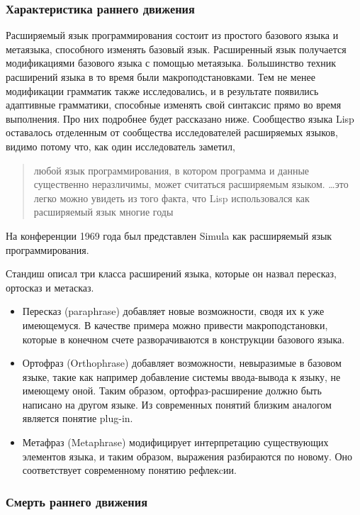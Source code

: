 \documentclass[a4paper,12pt]{article}
\begin{document}
\subsubsection{Характеристика раннего движения}

Расширяемый язык программирования состоит из простого базового языка и
метаязыка, способного изменять базовый язык. Расширенный язык получается
модификациями базового языка с помощью метаязыка. Большинство техник расширений
языка в то время были макроподстановками. Тем не менее модификации грамматик 
также исследовались, и в результате появились адаптивные грамматики, способные
изменять свой синтаксис прямо во время выполнения. Про них подробнее будет 
рассказано ниже. Сообщество языка Lisp оставалось отделенным от сообщества
исследователей расширяемых языков, видимо потому что, как один исследователь
заметил, \cite{harr60}
\begin{quote}
любой язык программирования, в котором программа и данные существенно
неразличимы, может считаться расширяемым языком. \ldots это легко можно увидеть
из того факта, что Lisp использовался как расширяемый язык многие годы
\end{quote}
На конференции 1969 года был представлен Simula как расширяемый язык
программирования.

Стандиш описал три класса расширений языка, которые он назвал пересказ,
ортосказ и метасказ.
\begin{itemize}
  \item Пересказ (paraphrase) добавляет новые возможности, сводя их к уже
  имеющемуся. В качестве примера можно привести макроподстановки, которые в
  конечном счете разворачиваются в конструкции базового языка.
  \item Ортофраз (Orthophrase) добавляет возможности, невыразимые в базовом
  языке, такие как например добавление системы ввода-вывода к языку, не имеющему оной. Таким
  образом, ортофраз-расширение должно быть написано на другом языке. Из
  современных понятий близким аналогом является понятие plug-in.
  \item Метафраз (Metaphrase) модифицирует интерпретацию существующих элементов
  языка, и таким образом, выражения разбираются по новому. Оно соответствует современному
  понятию рефлекcии.
\end{itemize}

\subsubsection{Смерть раннего движения}
\end{document}
